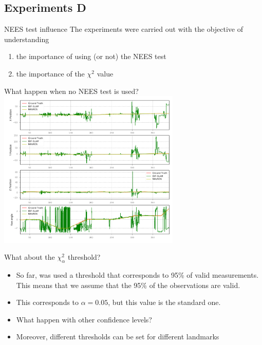 \documentclass[serif]{beamer}
\begin{document}
    \subsection{Experiments D}
    \begin{frame}{NEES test influence}
        The experiments were carried out with the objective of understanding
        \begin{enumerate}
            \item{the importance of using (or not) the NEES test}
            \item{the importance of the $\chi^2$ value}
        \end{enumerate}
    \end{frame}
    \begin{frame}{What happen when no NEES test is used?}
        \centering
        \includegraphics[width=0.65\textwidth]{Images/fig24-no-nees-test.png}
    \end{frame}

    \begin{frame}{What about the $\chi_{\alpha}^2$ threshold?}
        \begin{itemize}
            \item{So far, was used a threshold that corresponds to 95\% of valid measurements. This means that we assume that the 95\% of the observations are valid.}
            \item{This corresponds to $\alpha = 0.05$, but this value is the standard one.}
            \item{What happen with other confidence levels?}
            \item{Moreover, different thresholds can be set for different landmarks}
        \end{itemize}
    \end{frame}
\end{document}
